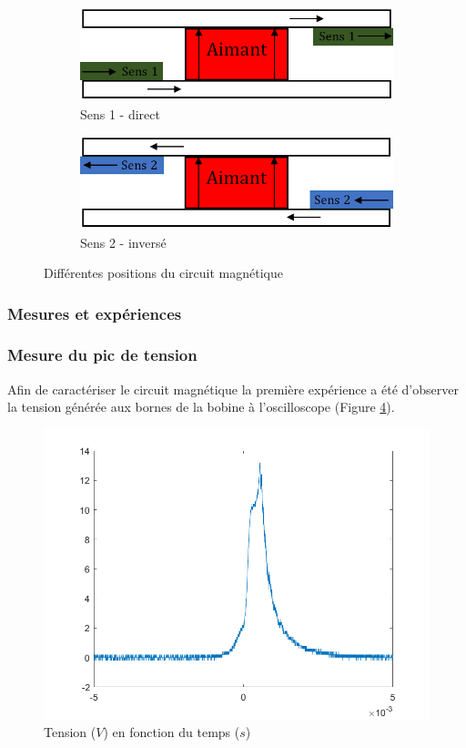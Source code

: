 \documentclass{rapportENS}
\begin{document}
\begin{figure}[ht!]
 \begin{subfigure}{.5\linewidth}
 \centering
 \includegraphics[width=.9\linewidth]{sens1.PNG}
 \vspace{0.2cm}
 \caption{Sens 1 - direct}
 \label{sens1}
 \end{subfigure}
 \begin{subfigure}{.5\linewidth}
 \centering
 \includegraphics[width=.9\linewidth]{sens2.PNG}
 \vspace{0.2cm}
 \caption{Sens 2 - inversé}
 \label{sens2}
 \end{subfigure}
 \vspace{0.2cm}
 \caption{Différentes positions du circuit magnétique}
 \label{schemacircuitmag}
\end{figure}
 
 \subsubsection{Mesures et expériences}
 
 \subsubsection*{Mesure du pic de tension}
 
 Afin de caractériser le circuit magnétique la première expérience a été d'observer la tension générée aux bornes de la bobine à l'oscilloscope (Figure \ref{tensionobine}). 
 
  \begin{figure}[h!]
 \includegraphics[width = .5\linewidth]{tension.png}
 \centering
 \vspace{0.3cm}
 \caption{Tension ($V$) en fonction du temps ($s$)}
 \label{tensionobine}
 \end{figure}
 
\end{document}
